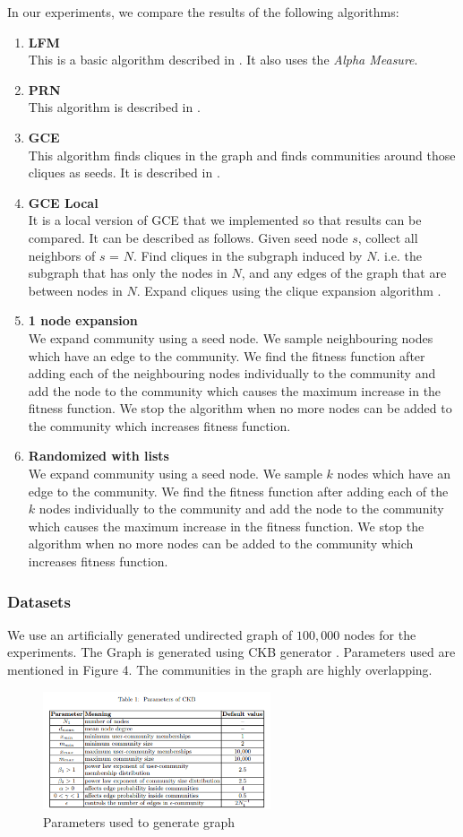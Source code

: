 \documentclass[a4paper]{article}
\newcommand\descitem[1]{\item{\bfseries #1}\\}
\begin{document}
In our experiments, we compare the results of the following algorithms:
\begin{enumerate}
    \descitem{LFM} This is a basic algorithm described in \cite{lancichinetti:2008}. It also uses the \textit{Alpha Measure}.
    \descitem{PRN} This algorithm is described in \cite{PRN}.
    \descitem{GCE} This algorithm finds cliques in the graph and finds communities around those cliques as seeds. It is described in \cite{1002.1827}.
    \descitem{GCE Local} It is a local version of GCE that we implemented so that results can be compared. It can be described as follows. Given seed node $s$, collect all neighbors of $s$ = $N$. Find cliques in the subgraph induced by $N$. i.e. the subgraph that has only the nodes in $N$, and any edges of the graph that are between nodes in $N$. Expand cliques using the clique expansion algorithm \cite{1002.1827}.

    \descitem{1 node expansion} We expand community using a seed node. We sample neighbouring nodes which have an edge to the community. We find the fitness function after adding each of the neighbouring nodes individually to the community and add the node to the community which causes the maximum increase in the fitness function. We stop the algorithm when no more nodes can be added to the community which increases fitness function.
  \descitem{Randomized with lists} We expand community using a seed node. We sample $k$ nodes which have an edge to the community. We find the fitness function after adding each of the $k$ nodes individually to the community and add the node to the community which causes the maximum increase in the fitness function. We stop the algorithm when no more nodes can be added to the community which increases fitness function.     
\end{enumerate}



\subsubsection{Datasets}
We use an artificially generated undirected graph of $100,000$ nodes for the experiments. The Graph is generated using CKB generator \cite{10.1007/978-3-319-05401-8_19}. Parameters used are mentioned in Figure 4. The communities in the graph are highly overlapping.




\begin{figure}[h] 
\centering
\includegraphics[width=0.6\textwidth]{ckb.PNG}
\caption{\label{fig:Parameters}Parameters used to generate graph}
\end{figure}
\end{document}
